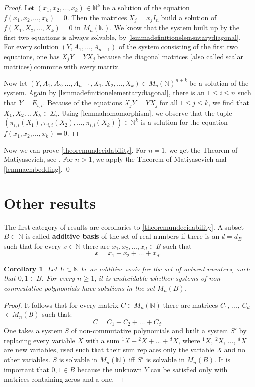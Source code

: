 \documentclass{article}
\theoremstyle{plain}
\newtheorem{corollary}{Corollary}[section]
\theoremstyle{definition}
\begin{document}
\begin{proof}
Let $(x_1, x_2, \dots, x_k) \in \mathbb N^k$ be a solution of the equation $f(x_1, x_2, \dots, x_k) = 0$. Then the matrices $X_j = x_j I_n$ build a solution of $f(X_1, X_2, \dots, X_k) = 0$ in $M_n(\mathbb N)$. We know that the system built up by the first two equations is always solvable, by \cref{lemmadefinitionelementarydiagonal}. For every solution $(Y, A_1, \dots, A_{n-1})$ of the system consisting of the first two equations, one has $X_j Y = Y X_j$ because the diagonal matrices (also called scalar matrices) commute with every matrix. 

Now let $(Y, A_1, A_2, \dots, A_{n-1}, X_1, X_2, \dots, X_k) \in M_n(\mathbb N)^{n+k}$ be a solution of the system. Again by  \cref{lemmadefinitionelementarydiagonal}, there is an $1 \leq i \leq n$ such that $Y = E_{i,i}$. Because of the equations $X_j Y = YX_j$ for all $1 \leq j \leq k$, we find that $X_1, X_2, \dots X_k \in \Sigma_i$. Using \cref{lemmahomomorphism}, we observe that the tuple $(\pi_{i,i}(X_1), \pi_{i,i}(X_2), \dots, \pi_{i,i}(X_k)) \in \mathbb N^k$ is a solution for the equation $f(x_1, x_2, \dots, x_k) = 0$. 
\end{proof}

Now we can prove \cref{theoremundecidability}. For $n = 1$, we get the Theorem of Matiyasevich, see \cite{Matiyasevich}. For $n > 1$, we apply the Theorem of Matiyasevich and \cref{lemmaembedding}. \qed

\section{Other results}\label{sect:other}

The first category of results are corollaries to \cref{theoremundecidability}. A subset $B \subset \mathbb N$ is called {\bf additive basis} of the set of real numbers if there is an $d = d_B$ such that for every $x \in \mathbb N$ there are $x_1, x_2, \dots, x_d \in B$ such that 
$$x = x_1 + x_2 + \dots + x_d.$$

\begin{corollary}
Let $B \subset \mathbb N$ be an additive basis for the set of natural numbers, such that $0, 1 \in B$. For every $n \geq 1$, it is undecidable whether systems of non-commutative polynomials have solutions in the set $M_n(B)$. 
\end{corollary}

\begin{proof}
It follows that for every matrix $C \in M_n(\mathbb N)$ there are matrices $C_1$, $\dots$, $C_d$ $\in M_n(B)$ such that:
$$ C = C_1 + C_2 + \dots + C_d.$$
One takes a system $S$ of non-commutative polynomials and built a system $S'$ by replacing every variable $X$ with a sum ${^1X} + {^2X} + \dots + {^dX}$, where $^1X$, $^2X$, $\dots$, $^dX$ are new variables, used such that their sum replaces only the variable $X$ and no other variables. $S$ is solvable in $M_n(\mathbb N)$ iff $S'$ is solvable in $M_n(B)$. It is important that $0, 1 \in B$ because the unknown $Y$ can be satisfied only with matrices containing zeros and a one.\end{proof} 
\end{document}

